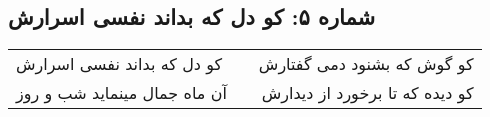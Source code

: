 \begin{center}
\section*{شماره ۵: کو دل که بداند نفسی اسرارش}
\label{sec:005}
\begin{longtable}{l p{0.5cm} r}
کو دل که بداند نفسی اسرارش
&&
کو گوش که بشنود دمی گفتارش
\\
آن ماه جمال مینماید شب و روز
&&
کو دیده که تا برخورد از دیدارش
\\
\end{longtable}
\end{center}
